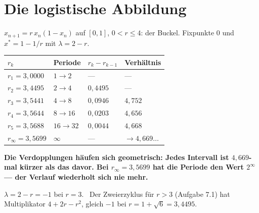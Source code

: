 \section{Die logistische Abbildung}

\begin{merksatz}
$x_{n+1} = r\,x_n(1 - x_n)$ auf $[0,1]$, $0 < r \le 4$: der Buckel. Fixpunkte $0$ und $x^{*} = 1 - 1/r$ mit $\lambda = 2 - r$.

\begin{center}
{\small
\renewcommand{\arraystretch}{1.46}
\begin{tabular}{@{}P{1.8cm}P{1.6cm}P{2.4cm}P{2.4cm}@{}}
\toprule
$r_k$ & \textbf{Periode} & $r_k - r_{k-1}$ & \textbf{Verhältnis}\\
\midrule
$r_1 = 3{,}0000$ & $1\to2$ & --- & ---\\
$r_2 = 3{,}4495$ & $2\to4$ & $0{,}4495$ & ---\\
$r_3 = 3{,}5441$ & $4\to8$ & $0{,}0946$ & $4{,}752$\\
$r_4 = 3{,}5644$ & $8\to16$ & $0{,}0203$ & $4{,}656$\\
$r_5 = 3{,}5688$ & $16\to32$ & $0{,}0044$ & $4{,}668$\\
$r_\infty = 3{,}5699$ & $\infty$ & --- & $\to 4{,}669\ldots$\\
\bottomrule
\end{tabular}}
\end{center}

\begin{center}
\begin{minipage}{0.9\textwidth}
\textbf{Die Verdopplungen häufen sich geometrisch: Jedes Intervall ist $4{,}669$-mal kürzer als das davor. Bei $r_\infty = 3{,}5699$ hat die Periode den Wert $2^{\infty}$ --- der Verlauf wiederholt sich nie mehr.}
\end{minipage}
\end{center}

$\lambda = 2 - r = -1$ bei $r = 3$. \checkmark\ Der Zweierzyklus für $r > 3$ (Aufgabe 7.1) hat Multiplikator $4 + 2r - r^{2}$, gleich $-1$ bei $r = 1 + \sqrt6 = 3{,}4495$. \checkmark

\begin{center}
\begin{minipage}{0.88\textwidth}
\end{minipage}
\end{center}
\end{merksatz}

